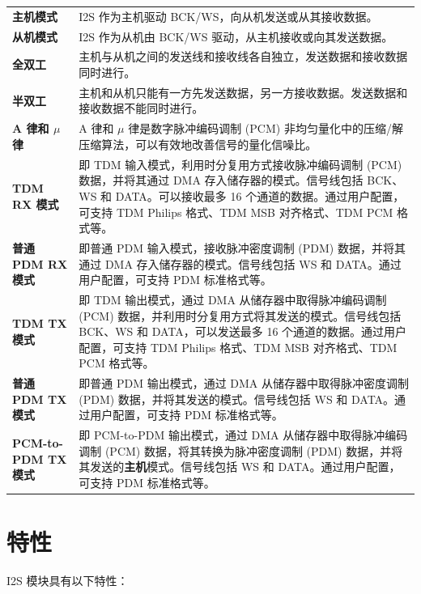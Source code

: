 \documentclass[main\_\_CN.tex]{subfiles}
\begin{document}
\begin{longtable}[c]{ R{4cm} p{10cm} }

\textbf{主机模式}     & I2S 作为主机驱动 BCK/WS，向从机发送或从其接收数据。 \\ 
\textbf{从机模式}      & I2S 作为从机由 BCK/WS 驱动，从主机接收或向其发送数据。 \\
\textbf{全双工} & 主机与从机之间的发送线和接收线各自独立，发送数据和接收数据同时进行。\\
\textbf{半双工} & 主机和从机只能有一方先发送数据，另一方接收数据。发送数据和接收数据不能同时进行。 \\
\textbf{A 律和 $\mu$ 律} & A 律和 \textrm{$\mu$} 律是数字脉冲编码调制 (PCM) 非均匀量化中的压缩/解压缩算法，可以有效地改善信号的量化信噪比。 \\
\textbf{TDM RX 模式} & 即 TDM 输入模式，利用时分复用方式接收脉冲编码调制 (PCM) 数据，并将其通过 DMA 存入储存器的模式。信号线包括 BCK、WS 和 DATA。可以接收最多 16 个通道的数据。通过用户配置，可支持 TDM Philips 格式、TDM MSB 对齐格式、TDM PCM 格式等。\\
\textbf{普通 PDM RX 模式} & 即普通 PDM 输入模式，接收脉冲密度调制 (PDM) 数据，并将其通过 DMA 存入储存器的模式。信号线包括 WS 和 DATA。通过用户配置，可支持 PDM 标准格式等。\\
\textbf{TDM TX 模式} & 即 TDM 输出模式，通过 DMA 从储存器中取得脉冲编码调制 (PCM) 数据，并利用时分复用方式将其发送的模式。信号线包括 BCK、WS 和 DATA，可以发送最多 16 个通道的数据。通过用户配置，可支持 TDM Philips 格式、TDM MSB 对齐格式、TDM PCM 格式等。\\
\textbf{普通 PDM TX 模式} & 即普通 PDM 输出模式，通过 DMA 从储存器中取得脉冲密度调制 (PDM) 数据，并将其发送的模式。信号线包括 WS 和 DATA。通过用户配置，可支持 PDM 标准格式等。\\
\textbf{PCM-to-PDM TX 模式} & 即 PCM-to-PDM 输出模式，通过 DMA 从储存器中取得脉冲编码调制 (PCM) 数据，将其转换为脉冲密度调制 (PDM) 数据，并将其发送的\textbf{主机}模式。信号线包括 WS 和 DATA。通过用户配置，可支持 PDM 标准格式等。\\
\end{longtable}

\section{特性}

I2S 模块具有以下特性：
\end{document}
